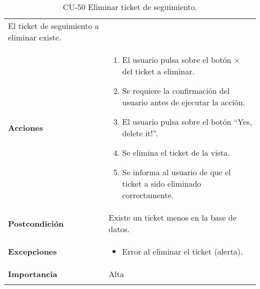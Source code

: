 \begin{longtable}[]{@{}ll@{}}
\begin{minipage}[t]{0.70\columnwidth}
El ticket de seguimiento a eliminar existe.\strut
\end{minipage}\tabularnewline
\begin{minipage}[t]{0.24\columnwidth}\raggedright
\textbf{Acciones}\strut
\end{minipage} & \begin{minipage}[t]{0.70\columnwidth}\raggedright
\begin{enumerate}
\def\labelenumi{\arabic{enumi}.}
\tightlist
\item
  El usuario pulsa sobre el botón {$\times$} del ticket a eliminar.
\item
  Se requiere la confirmación del usuario antes de ejecutar la acción.
\item
  El usuario pulsa sobre el botón ``Yes, delete it!''.
\item
  Se elimina el ticket de la vista.
\item
  Se informa al usuario de que el ticket a sido eliminado correctamente.
\end{enumerate}\strut
\end{minipage}\tabularnewline
\begin{minipage}[t]{0.24\columnwidth}\raggedright
\textbf{Postcondición}\strut
\end{minipage} & \begin{minipage}[t]{0.70\columnwidth}\raggedright
Existe un ticket menos en la base de datos.\strut
\end{minipage}\tabularnewline
\begin{minipage}[t]{0.24\columnwidth}\raggedright
\textbf{Excepciones}\strut
\end{minipage} & \begin{minipage}[t]{0.70\columnwidth}\raggedright
\begin{itemize}
\tightlist
\item
  Error al eliminar el ticket (alerta).
\end{itemize}\strut
\end{minipage}\tabularnewline
\begin{minipage}[t]{0.24\columnwidth}\raggedright
\textbf{Importancia}\strut
\end{minipage} & \begin{minipage}[t]{0.70\columnwidth}\raggedright
Alta\strut
\end{minipage}\tabularnewline
\bottomrule
\caption{CU-50 Eliminar ticket de seguimiento.}
\end{longtable}

